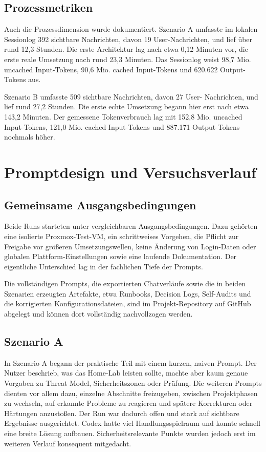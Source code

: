 \subsection{Prozessmetriken}

Auch die Prozessdimension wurde dokumentiert. Szenario A umfasste im lokalen Sessionlog 392 sichtbare Nachrichten, davon 19 User-Nachrichten, und lief über rund 12,3 Stunden. Die erste Architektur lag nach etwa 0,12 Minuten vor, die erste reale Umsetzung nach rund 23,3 Minuten. Das Sessionlog weist 98,7 Mio. uncached Input-Tokens, 90,6 Mio. cached Input-Tokens und 620.622 Output-Tokens aus.

Szenario B umfasste 509 sichtbare Nachrichten, davon 27 User- Nachrichten, und lief rund 27,2 Stunden. Die erste echte Umsetzung begann hier erst nach etwa 143,2 Minuten. Der gemessene Tokenverbrauch lag mit 152,8 Mio. uncached Input-Tokens, 121,0 Mio. cached Input-Tokens und 887.171 Output-Tokens nochmals höher.

\section{Promptdesign und Versuchsverlauf}

\subsection{Gemeinsame Ausgangsbedingungen}

Beide Runs starteten unter vergleichbaren Ausgangsbedingungen. Dazu gehörten eine isolierte Proxmox-Test-\acs{VM}, ein schrittweises Vorgehen, die Pflicht zur Freigabe vor größeren Umsetzungswellen, keine Änderung von Login-Daten oder globalen Plattform-Einstellungen sowie eine laufende Dokumentation. Der eigentliche Unterschied lag in der fachlichen Tiefe der Prompts.

Die vollständigen Prompts, die exportierten Chatverläufe sowie die in beiden Szenarien erzeugten Artefakte, etwa Runbooks, Decision Logs, Self-Audits und die korrigierten Konfigurationsdateien, sind im Projekt-Repository auf GitHub abgelegt und können dort vollständig nachvollzogen werden.\cite{ki_eval_github}


\subsection{Szenario A}

In Szenario A begann der praktische Teil mit einem kurzen, naiven Prompt. Der Nutzer beschrieb, was das Home-Lab leisten sollte, machte aber kaum genaue Vorgaben zu Threat Model, Sicherheitszonen oder Prüfung. Die weiteren Prompts dienten vor allem dazu, einzelne Abschnitte freizugeben, zwischen Projektphasen zu wechseln, auf erkannte Probleme zu reagieren und spätere Korrekturen oder Härtungen anzustoßen. Der Run war dadurch offen und stark auf sichtbare Ergebnisse ausgerichtet. Codex hatte viel Handlungsspielraum und konnte schnell eine breite Lösung aufbauen. Sicherheitsrelevante Punkte wurden jedoch erst im weiteren Verlauf konsequent mitgedacht.

